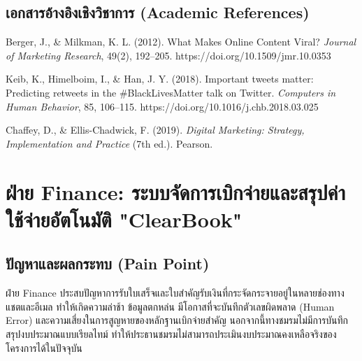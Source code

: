 \documentclass[10pt,a4paper]{article}
\begin{document}
\subsection{เอกสารอ้างอิงเชิงวิชาการ (Academic References)}
\begin{enumerate}[label={[\arabic*]}]
  \item Berger, J., \& Milkman, K. L. (2012). What Makes Online Content Viral? \textit{Journal of Marketing Research}, 49(2), 192--205. https://doi.org/10.1509/jmr.10.0353
  \item Keib, K., Himelboim, I., \& Han, J. Y. (2018). Important tweets matter: Predicting retweets in the \#BlackLivesMatter talk on Twitter. \textit{Computers in Human Behavior}, 85, 106--115. https://doi.org/10.1016/j.chb.2018.03.025
  \item Chaffey, D., \& Ellis-Chadwick, F. (2019). \textit{Digital Marketing: Strategy, Implementation and Practice} (7th ed.). Pearson.
\end{enumerate}

\newpage

\section{ฝ่าย Finance: ระบบจัดการเบิกจ่ายและสรุปค่าใช้จ่ายอัตโนมัติ "ClearBook"}
\subsection{ปัญหาและผลกระทบ (Pain Point)}
ฝ่าย Finance ประสบปัญหาการรับใบเสร็จและใบสำคัญรับเงินที่กระจัดกระจายอยู่ในหลายช่องทางแชตและอีเมล ทำให้เกิดความล่าช้า ข้อมูลตกหล่น มีโอกาสที่จะบันทึกตัวเลขผิดพลาด (Human Error) และความเสี่ยงในการสูญหายของหลักฐานเบิกจ่ายสำคัญ นอกจากนี้ทางชมรมไม่มีการบันทึกสรุปงบประมาณแบบเรียลไทม์ ทำให้ประธานชมรมไม่สามารถประเมินงบประมาณคงเหลือจริงของโครงการได้ในปัจจุบัน
\end{document}
